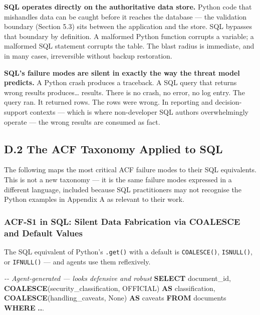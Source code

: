 \documentclass[a4paper,11pt]{report}
\newenvironment{Shaded}{\begin{snugshade}}{\end{snugshade}}
\newcommand{\CommentTok}[1]{\textcolor[rgb]{0.56,0.35,0.01}{\textit{#1}}}
\newcommand{\FunctionTok}[1]{\textcolor[rgb]{0.13,0.29,0.53}{\textbf{#1}}}
\newcommand{\KeywordTok}[1]{\textcolor[rgb]{0.13,0.29,0.53}{\textbf{#1}}}
\newcommand{\NormalTok}[1]{#1}
\newcommand{\OperatorTok}[1]{\textcolor[rgb]{0.81,0.36,0.00}{\textbf{#1}}}
\newcommand{\StringTok}[1]{\textcolor[rgb]{0.31,0.60,0.02}{#1}}
\begin{document}
\textbf{SQL operates directly on the authoritative data store.} Python
code that mishandles data can be caught before it reaches the database
--- the validation boundary (Section 5.3) sits between the application
and the store. SQL bypasses that boundary by definition. A malformed
Python function corrupts a variable; a malformed SQL statement corrupts
the table. The blast radius is immediate, and in many cases,
irreversible without backup restoration.

\textbf{SQL's failure modes are silent in exactly the way the threat
model predicts.} A Python crash produces a traceback. A SQL query that
returns wrong results produces\ldots{} results. There is no crash, no
error, no log entry. The query ran. It returned rows. The rows were
wrong. In reporting and decision-support contexts --- which is where
non-developer SQL authors overwhelmingly operate --- the wrong results
are consumed as fact.

\hypertarget{d.2-the-acf-taxonomy-applied-to-sql}{%
\subsection{D.2 The ACF Taxonomy Applied to
SQL}\label{d.2-the-acf-taxonomy-applied-to-sql}}

The following maps the most critical ACF failure modes to their SQL
equivalents. This is not a new taxonomy --- it is the same failure modes
expressed in a different language, included because SQL practitioners
may not recognise the Python examples in Appendix A as relevant to their
work.

\hypertarget{acf-s1-in-sql-silent-data-fabrication-via-coalesce-and-default-values}{%
\subsubsection{ACF-S1 in SQL: Silent Data Fabrication via COALESCE and
Default
Values}\label{acf-s1-in-sql-silent-data-fabrication-via-coalesce-and-default-values}}

The SQL equivalent of Python's \texttt{.get()} with a default is
\texttt{COALESCE()}, \texttt{ISNULL()}, or \texttt{IFNULL()} --- and
agents use them reflexively.

\begin{Shaded}
\begin{Highlighting}[]
\CommentTok{{-}{-} Agent{-}generated — looks defensive and robust}
\KeywordTok{SELECT}
\NormalTok{    document\_id,}
    \FunctionTok{COALESCE}\NormalTok{(security\_classification, }\StringTok{\textquotesingle{}OFFICIAL\textquotesingle{}}\NormalTok{) }\KeywordTok{AS}\NormalTok{ classification,}
    \FunctionTok{COALESCE}\NormalTok{(handling\_caveats, }\StringTok{\textquotesingle{}None\textquotesingle{}}\NormalTok{)            }\KeywordTok{AS}\NormalTok{ caveats}
\KeywordTok{FROM}\NormalTok{ documents}
\KeywordTok{WHERE} \OperatorTok{..}\NormalTok{.}
\end{Highlighting}
\end{Shaded}
\end{document}
